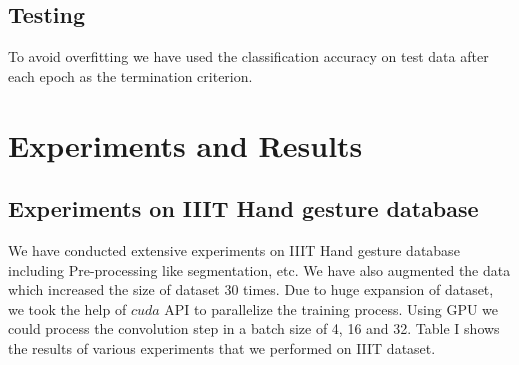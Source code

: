 \documentclass[conference]{IEEEtran}
\begin{document}
\subsection{Testing}
To avoid overfitting we have used the classification accuracy on test data after each epoch as the termination criterion.

\section{Experiments and Results}

\subsection{Experiments on IIIT Hand gesture database}

We have conducted extensive experiments on IIIT Hand gesture database including Pre-processing like segmentation, etc.
We have also augmented the data which increased the size of dataset 30 times. Due to huge expansion of dataset, we took the help of
$cuda$ API to parallelize the training process. Using GPU we could process the convolution step in a batch size of 4, 16 and 32.
Table I shows the results of various experiments that we performed on IIIT dataset.
\end{document}

